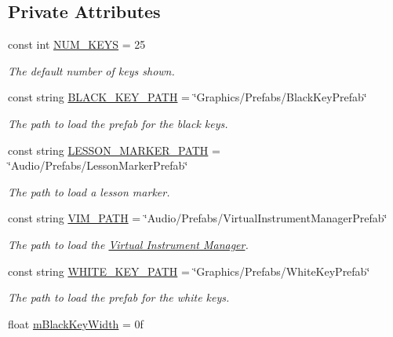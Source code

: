 \subsection*{Private Attributes}
\begin{DoxyCompactItemize}
\item 
const int \hyperlink{group___key_contain_const_gaa8fe6473e6396976e52c5793f027380e}{N\+U\+M\+\_\+\+K\+E\+YS} = 25
\begin{DoxyCompactList}\small\item\em The default number of keys shown. \end{DoxyCompactList}\item 
const string \hyperlink{group___key_contain_const_gac968b0d398c545a13abad255d8287825}{B\+L\+A\+C\+K\+\_\+\+K\+E\+Y\+\_\+\+P\+A\+TH} = \char`\"{}Graphics/Prefabs/Black\+Key\+Prefab\char`\"{}
\begin{DoxyCompactList}\small\item\em The path to load the prefab for the black keys. \end{DoxyCompactList}\item 
const string \hyperlink{group___key_contain_const_ga4caccd17bb57caca66047951046aa44a}{L\+E\+S\+S\+O\+N\+\_\+\+M\+A\+R\+K\+E\+R\+\_\+\+P\+A\+TH} = \char`\"{}Audio/Prefabs/Lesson\+Marker\+Prefab\char`\"{}
\begin{DoxyCompactList}\small\item\em The path to load a lesson marker. \end{DoxyCompactList}\item 
const string \hyperlink{group___key_contain_const_ga8dc749271ab095b5759129459bcb647a}{V\+I\+M\+\_\+\+P\+A\+TH} = \char`\"{}Audio/Prefabs/Virtual\+Instrument\+Manager\+Prefab\char`\"{}
\begin{DoxyCompactList}\small\item\em The path to load the \hyperlink{group___v_i_m}{Virtual Instrument Manager}. \end{DoxyCompactList}\item 
const string \hyperlink{group___key_contain_const_ga8ce7e53d5c067095ee26b96fcc522584}{W\+H\+I\+T\+E\+\_\+\+K\+E\+Y\+\_\+\+P\+A\+TH} = \char`\"{}Graphics/Prefabs/White\+Key\+Prefab\char`\"{}
\begin{DoxyCompactList}\small\item\em The path to load the prefab for the white keys. \end{DoxyCompactList}\item 
float \hyperlink{group___key_contain_priv_var_ga6461d765c3904e6a3031558d7385be25}{m\+Black\+Key\+Width} = 0f

\end{DoxyCompactItemize}
